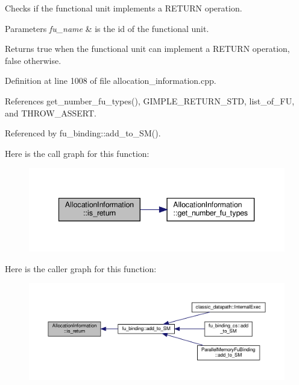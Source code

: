 Checks if the functional unit implements a R\+E\+T\+U\+RN operation. 


\begin{DoxyParams}{Parameters}
{\em fu\+\_\+name} & is the id of the functional unit. \\
\hline
\end{DoxyParams}
\begin{DoxyReturn}{Returns}
true when the functional unit can implement a R\+E\+T\+U\+RN operation, false otherwise. 
\end{DoxyReturn}


Definition at line 1008 of file allocation\+\_\+information.\+cpp.



References get\+\_\+number\+\_\+fu\+\_\+types(), G\+I\+M\+P\+L\+E\+\_\+\+R\+E\+T\+U\+R\+N\+\_\+\+S\+TD, list\+\_\+of\+\_\+\+FU, and T\+H\+R\+O\+W\+\_\+\+A\+S\+S\+E\+RT.



Referenced by fu\+\_\+binding\+::add\+\_\+to\+\_\+\+S\+M().

Here is the call graph for this function\+:
\nopagebreak
\begin{figure}[H]
\begin{center}
\leavevmode
\includegraphics[width=340pt]{d7/d79/classAllocationInformation_a591cf1df78a6a6a8261906316a9185a4_cgraph}
\end{center}
\end{figure}
Here is the caller graph for this function\+:
\nopagebreak
\begin{figure}[H]
\begin{center}
\leavevmode
\includegraphics[width=350pt]{d7/d79/classAllocationInformation_a591cf1df78a6a6a8261906316a9185a4_icgraph}
\end{center}
\end{figure}
\mbox{\label{classAllocationInformation_a9cb53d3aaad49e972193e98b8ab81e0a}} 
